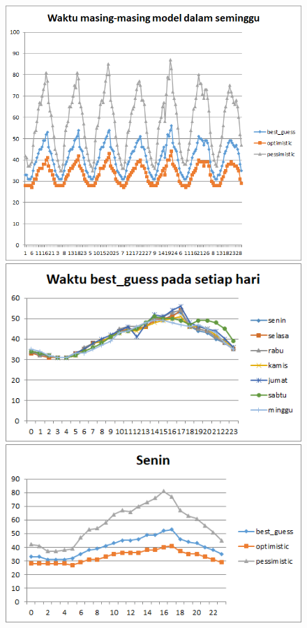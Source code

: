 \begin{figure}[H]
				\centering		
				\includegraphics[scale=0.7]{Gambar/waktuallmodelsampel124072017normal.png}
				\includegraphics[]{Gambar/waktubestguesssampel124072017normal.png}
				\includegraphics[]{Gambar/seninsampel124072017normal.png}
\end{figure}
			
